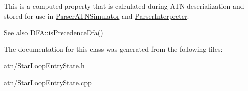 This is a computed property that is calculated during A\+TN deserialization and stored for use in \hyperlink{classantlr4_1_1atn_1_1ParserATNSimulator}{Parser\+A\+T\+N\+Simulator} and \hyperlink{classantlr4_1_1ParserInterpreter}{Parser\+Interpreter}.

\begin{DoxySeeAlso}{See also}
D\+F\+A\+::is\+Precedence\+Dfa() 
\end{DoxySeeAlso}


The documentation for this class was generated from the following files\+:\begin{DoxyCompactItemize}
\item 
atn/Star\+Loop\+Entry\+State.\+h\item 
atn/Star\+Loop\+Entry\+State.\+cpp\end{DoxyCompactItemize}
